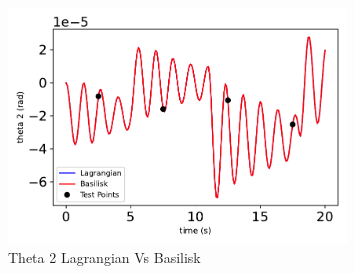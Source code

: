 \begin{figure}[htbp]\centerline{\includegraphics[width=0.8\textwidth]{AutoTeX/Theta2LagrangianVsBasilisk}}\caption{Theta 2 Lagrangian Vs Basilisk}\label{fig:Theta2LagrangianVsBasilisk}\end{figure}